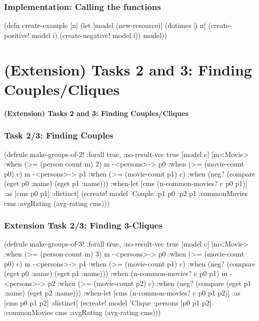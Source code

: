 \documentclass{beamer}
\begin{document}
\begin{frame}[fragile]
\frametitle{Implementation: Calling the functions}
  \begin{clojurecode}
(defn create-example [n]
  (let [model (new-resource)]
    (dotimes [i n]
      (create-positive! model i)
      (create-negative! model i))
    model))
  \end{clojurecode}
\end{frame}

\section{(Extension) Tasks 2 and 3: Finding Couples/Cliques}

\begin{frame}
  \LARGE
  \begin{center}
    \textbf{(Extension) Tasks 2 and 3: Finding Couples/Cliques}
  \end{center}
\end{frame}

\begin{frame}[fragile]
  \frametitle{Task 2/3: Finding Couples}
  \begin{clojurecode}
(defrule make-groups-of-2!
  {:forall true, :no-result-vec true}
  [model c]
  [m<Movie>          :when (>= (person-count m) 2)
   m -<persons>-> p0 :when (>= (movie-count p0) c)
   m -<persons>-> p1 :when (>= (movie-count p1) c)
   :when (neg? (compare (eget p0 :name)
                        (eget p1 :name)))
   :when-let [cms (n-common-movies? c p0 p1)]
   :as [cms p0 p1]
   :distinct]
  (ecreate! model 'Couple :p1 p0 :p2 p1
            :commonMovies cms :avgRating (avg-rating cms)))
  \end{clojurecode}
\end{frame}

\begin{frame}[fragile]
  \frametitle{Extension Task 2/3: Finding 3-Cliques}
  \begin{clojurecode}
(defrule make-groups-of-3!
  {:forall true, :no-result-vec true}
  [model c]
  [m<Movie>          :when (>= (person-count m) 3)
   m -<persons>-> p0 :when (>= (movie-count p0) c)
   m -<persons>-> p1 :when (>= (movie-count p1) c)
   :when (neg? (compare (eget p0 :name)
                        (eget p1 :name)))
   :when (n-common-movies? c p0 p1)
   m -<persons>-> p2 :when (>= (movie-count p2) c)
   :when (neg? (compare (eget p1 :name)
                        (eget p2 :name)))
   :when-let [cms (n-common-movies? c p0 p1 p2)]
   :as [cms p0 p1 p2]
   :distinct]
  (ecreate! model 'Clique :persons [p0 p1 p2]
           :commonMovies cms :avgRating (avg-rating cms)))
  \end{clojurecode}
\end{frame}
\end{document}
